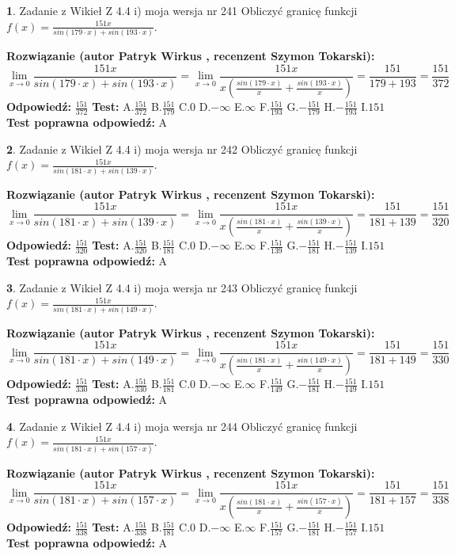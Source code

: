 \documentclass[12pt, a4paper]{article}
\theoremstyle{definition} %
\newtheorem{zad}{}
\newcommand{\zadStart}[1]{\begin{zad}#1\newline}
\newcommand{\zadStop}{\end{zad}}
\newcommand{\rozwStart}[2]{\noindent \textbf{Rozwiązanie (autor #1 , recenzent #2): }\newline}
\newcommand{\rozwStop}{\newline}
\newcommand{\odpStart}{\noindent \textbf{Odpowiedź:}\newline}
\newcommand{\odpStop}{\newline}
\newcommand{\testStart}{\noindent \textbf{Test:}\newline}
\newcommand{\testStop}{\newline}
\newcommand{\kluczStart}{\noindent \textbf{Test poprawna odpowiedź:}\newline}
\newcommand{\kluczStop}{\newline}
\begin{document}
\zadStart{Zadanie z Wikieł Z 4.4 i) moja wersja nr 241}
Obliczyć granicę funkcji $f(x)=\frac{151x}{sin(179\cdot x) +sin(193\cdot x)}$.
\zadStop
\rozwStart{Patryk Wirkus}{Szymon Tokarski}
$$\lim\limits_{x\to 0}\frac{151x}{sin(179\cdot x) +sin(193\cdot x)}=\lim\limits_{x\to 0}\frac{151x}{x(\frac{sin(179\cdot x)}{x}+\frac{sin(193\cdot x)}{x})}=\frac{151}{179+193} = \frac{151}{372}$$
\rozwStop
\odpStart
$\frac{151}{372}$
\odpStop
\testStart
A.$\frac{151}{372}$
B.$\frac{151}{179}$
C.$0$
D.$-\infty$
E.$\infty$
F.$\frac{151}{193}$
G.$-\frac{151}{179}$
H.$-\frac{151}{193}$
I.$151$
\testStop
\kluczStart
A
\kluczStop



\zadStart{Zadanie z Wikieł Z 4.4 i) moja wersja nr 242}
Obliczyć granicę funkcji $f(x)=\frac{151x}{sin(181\cdot x) +sin(139\cdot x)}$.
\zadStop
\rozwStart{Patryk Wirkus}{Szymon Tokarski}
$$\lim\limits_{x\to 0}\frac{151x}{sin(181\cdot x) +sin(139\cdot x)}=\lim\limits_{x\to 0}\frac{151x}{x(\frac{sin(181\cdot x)}{x}+\frac{sin(139\cdot x)}{x})}=\frac{151}{181+139} = \frac{151}{320}$$
\rozwStop
\odpStart
$\frac{151}{320}$
\odpStop
\testStart
A.$\frac{151}{320}$
B.$\frac{151}{181}$
C.$0$
D.$-\infty$
E.$\infty$
F.$\frac{151}{139}$
G.$-\frac{151}{181}$
H.$-\frac{151}{139}$
I.$151$
\testStop
\kluczStart
A
\kluczStop



\zadStart{Zadanie z Wikieł Z 4.4 i) moja wersja nr 243}
Obliczyć granicę funkcji $f(x)=\frac{151x}{sin(181\cdot x) +sin(149\cdot x)}$.
\zadStop
\rozwStart{Patryk Wirkus}{Szymon Tokarski}
$$\lim\limits_{x\to 0}\frac{151x}{sin(181\cdot x) +sin(149\cdot x)}=\lim\limits_{x\to 0}\frac{151x}{x(\frac{sin(181\cdot x)}{x}+\frac{sin(149\cdot x)}{x})}=\frac{151}{181+149} = \frac{151}{330}$$
\rozwStop
\odpStart
$\frac{151}{330}$
\odpStop
\testStart
A.$\frac{151}{330}$
B.$\frac{151}{181}$
C.$0$
D.$-\infty$
E.$\infty$
F.$\frac{151}{149}$
G.$-\frac{151}{181}$
H.$-\frac{151}{149}$
I.$151$
\testStop
\kluczStart
A
\kluczStop



\zadStart{Zadanie z Wikieł Z 4.4 i) moja wersja nr 244}
Obliczyć granicę funkcji $f(x)=\frac{151x}{sin(181\cdot x) +sin(157\cdot x)}$.
\zadStop
\rozwStart{Patryk Wirkus}{Szymon Tokarski}
$$\lim\limits_{x\to 0}\frac{151x}{sin(181\cdot x) +sin(157\cdot x)}=\lim\limits_{x\to 0}\frac{151x}{x(\frac{sin(181\cdot x)}{x}+\frac{sin(157\cdot x)}{x})}=\frac{151}{181+157} = \frac{151}{338}$$
\rozwStop
\odpStart
$\frac{151}{338}$
\odpStop
\testStart
A.$\frac{151}{338}$
B.$\frac{151}{181}$
C.$0$
D.$-\infty$
E.$\infty$
F.$\frac{151}{157}$
G.$-\frac{151}{181}$
H.$-\frac{151}{157}$
I.$151$
\testStop
\kluczStart
A
\kluczStop
\end{document}

